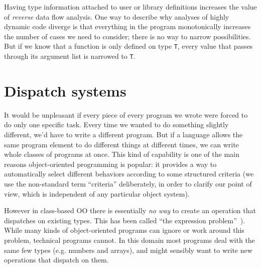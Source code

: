 Having type information attached to user or library definitions
increases the value of \emph{reverse} data flow analysis.
One way to describe why analyses of highly dynamic code diverge
is that everything in the program monotonically increases the
number of cases we need to consider; there is no way to
narrow possibilities.
But if we know that a function is only defined on type \texttt{T},
every value that passes through its argument list is narrowed to
\texttt{T}.





\section{Dispatch systems}

It would be unpleasant if every piece of every program we wrote were forced
to do only one specific task.
Every time we wanted to do something slightly different, we'd have to write
a different program.
But if a language allows the same program element to do different things at
different times, we can write whole classes of programs at once.
This kind of capability is one of the main reasons object-oriented programming
is popular: it provides a way to automatically select different behaviors
according to some structured criteria
(we use the non-standard term ``criteria'' deliberately, in order
to clarify our point of view, which is independent of any particular
object system).

However in class-based OO there is essentially \emph{no way} to create an
operation that dispatches on existing types.
This has been called ``the expression problem''~\cite{wadler1998expression}).
While many kinds of object-oriented programs can ignore or work around
this problem, technical programs cannot.
In this domain most programs deal with the same
few types (e.g. numbers and arrays), and might sensibly want to write new
operations that dispatch on them.

